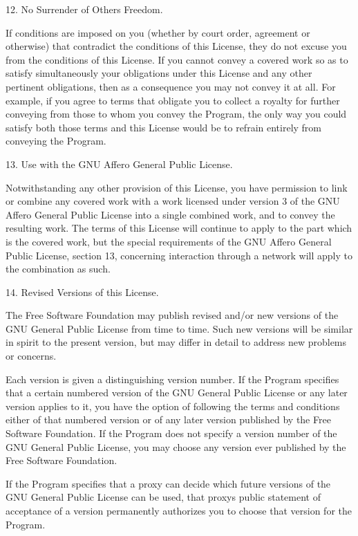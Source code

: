 \documentclass[letterpaper,10pt,english]{sphinxmanual}
\begin{document}
\begin{sphinxVerbatim}[commandchars=\\\{\}]
  12. No Surrender of Others\PYGZsq{} Freedom.

  If conditions are imposed on you (whether by court order, agreement or
otherwise) that contradict the conditions of this License, they do not
excuse you from the conditions of this License.  If you cannot convey a
covered work so as to satisfy simultaneously your obligations under this
License and any other pertinent obligations, then as a consequence you may
not convey it at all.  For example, if you agree to terms that obligate you
to collect a royalty for further conveying from those to whom you convey
the Program, the only way you could satisfy both those terms and this
License would be to refrain entirely from conveying the Program.

  13. Use with the GNU Affero General Public License.

  Notwithstanding any other provision of this License, you have
permission to link or combine any covered work with a work licensed
under version 3 of the GNU Affero General Public License into a single
combined work, and to convey the resulting work.  The terms of this
License will continue to apply to the part which is the covered work,
but the special requirements of the GNU Affero General Public License,
section 13, concerning interaction through a network will apply to the
combination as such.

  14. Revised Versions of this License.

  The Free Software Foundation may publish revised and/or new versions of
the GNU General Public License from time to time.  Such new versions will
be similar in spirit to the present version, but may differ in detail to
address new problems or concerns.

  Each version is given a distinguishing version number.  If the
Program specifies that a certain numbered version of the GNU General
Public License \PYGZdq{}or any later version\PYGZdq{} applies to it, you have the
option of following the terms and conditions either of that numbered
version or of any later version published by the Free Software
Foundation.  If the Program does not specify a version number of the
GNU General Public License, you may choose any version ever published
by the Free Software Foundation.

  If the Program specifies that a proxy can decide which future
versions of the GNU General Public License can be used, that proxy\PYGZsq{}s
public statement of acceptance of a version permanently authorizes you
to choose that version for the Program.


\end{sphinxVerbatim}
\end{document}
